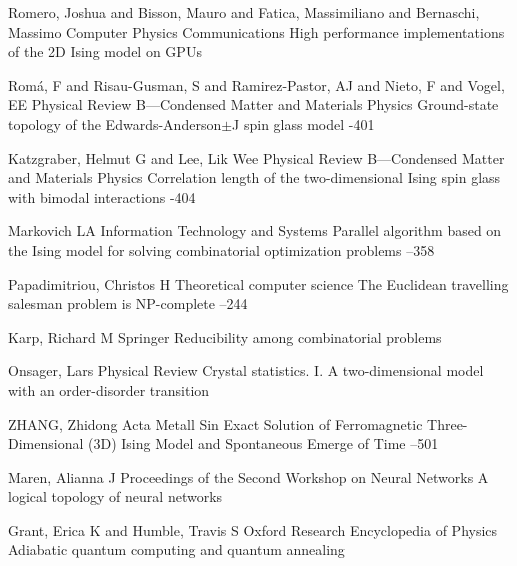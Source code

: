 \documentclass[10pt]{article}
\begin{document}
	
	\begin{thebibliography}{20}
		\setlength{\parsep}{0pt}\setlength{\itemsep}{3pt}
		
		\by Romero, Joshua and Bisson, Mauro and Fatica, Massimiliano and Bernaschi, Massimo
		\jour Computer Physics Communications
		\paper High performance implementations of the 2D Ising model on GPUs
		
		\by Rom{\'a}, F and Risau-Gusman, S and Ramirez-Pastor, AJ and Nieto, F and Vogel, EE
		\jour Physical Review B—Condensed Matter and Materials Physics
		\paper Ground-state topology of the Edwards-Anderson$\pm$J spin glass model
		-401
		
		\by Katzgraber, Helmut G and Lee, Lik Wee
		\jour Physical Review B—Condensed Matter and Materials Physics
		\paper Correlation length of the two-dimensional Ising spin glass with bimodal interactions
		-404
		
		\by Markovich LA
		\jour Information Technology and Systems
		\paper Parallel algorithm based on the Ising model for solving combinatorial optimization problems
		--358
		
		\by Papadimitriou, Christos H
		\jour Theoretical computer science
		\paper The Euclidean travelling salesman problem is NP-complete
		--244
		
		\by Karp, Richard M
		\jour Springer
		\paper Reducibility among combinatorial problems
		
		\by Onsager, Lars
		\jour Physical Review
		\paper Crystal statistics. I. A two-dimensional model with an order-disorder transition
		
		\by ZHANG, Zhidong
		\jour Acta Metall Sin
		\paper Exact Solution of Ferromagnetic Three-Dimensional (3D) Ising Model and Spontaneous Emerge of Time
		--501
		
		\by Maren, Alianna J
		\jour Proceedings of the Second Workshop on Neural Networks
		\paper A logical topology of neural networks
		
		\by Grant, Erica K and Humble, Travis S
		\jour Oxford Research Encyclopedia of Physics
		\paper Adiabatic quantum computing and quantum annealing
		

\end{thebibliography}
\end{document}
